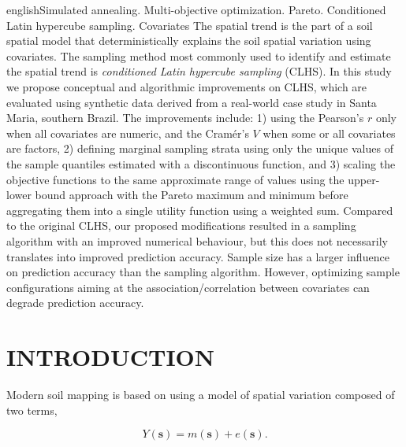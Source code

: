 \def\enkeys{Simulated annealing. Multi-objective optimization. Pareto. Conditioned Latin hypercube sampling. 
Covariates}
  
\begin{chapterabstract}{english}{\enkeys}
The spatial trend is the part of a soil spatial model that deterministically explains the soil spatial 
variation using covariates. The sampling method most commonly used to identify and estimate the spatial trend 
is \emph{conditioned Latin hypercube sampling} (CLHS). In this study we propose conceptual and algorithmic 
improvements on CLHS, which are evaluated using synthetic data derived from a real-world  case study in Santa 
Maria, southern Brazil. The improvements include: 1) using the Pearson's $r$ only when all covariates are 
numeric, and the Cramér's $V$ when some or all covariates are factors, 2) defining marginal sampling 
strata using only the unique values of the sample quantiles estimated with a discontinuous function, and 3) 
scaling the objective functions to the same approximate range of values using the upper-lower bound approach 
with the Pareto maximum and minimum before aggregating them into a single utility function using a weighted 
sum. Compared to the original CLHS, our proposed modifications resulted in a sampling algorithm with an 
improved numerical behaviour, but this does not necessarily translates into improved prediction accuracy. 
Sample size has a larger influence on prediction accuracy than the sampling algorithm. However, 
optimizing sample configurations aiming at the association/correlation between covariates can degrade 
prediction accuracy.
\end{chapterabstract}

\formatchapter

\section{INTRODUCTION}
\label{sec:chap08-intro}

Modern soil mapping is based on using a model of spatial variation composed of two terms, 

\begin{equation}\label{eqn:chap08-lmm} %
 Y(\boldsymbol{s}) = m(\boldsymbol{s}) + e(\boldsymbol{s}).
\end{equation}

\def\footgerard{\footnote{Gerard Heuvelink shared the same opinion during his Richard Webster Medal speech at 
the conference of the Pedometrics Commission of the IUSS, which took place from 14--18 September 2015, in 
Córdoba, Spain.}}

